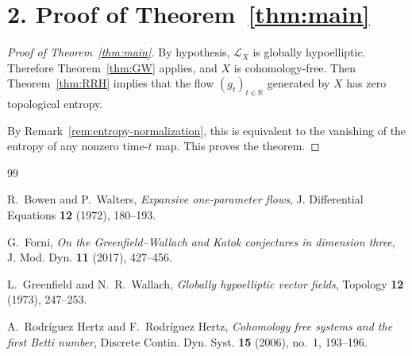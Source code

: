 \documentclass[11pt]{article}
\theoremstyle{definition}
\theoremstyle{remark}
\begin{document}
\section*{2. Proof of Theorem~\ref{thm:main}}

\begin{proof}[Proof of Theorem~\ref{thm:main}]
By hypothesis, $\mathcal L_X$ is globally hypoelliptic. Therefore Theorem~\ref{thm:GW} applies, and $X$ is cohomology-free. Then Theorem~\ref{thm:RRH} implies that the flow $(g_t)_{t\in\mathbb R}$ generated by $X$ has zero topological entropy.

By Remark~\ref{rem:entropy-normalization}, this is equivalent to the vanishing of the entropy of any nonzero time-$t$ map. This proves the theorem.
\end{proof}

\begin{thebibliography}{99}

R.~Bowen and P.~Walters,
\emph{Expansive one-parameter flows},
J. Differential Equations \textbf{12} (1972), 180--193.

G.~Forni,
\emph{On the Greenfield--Wallach and Katok conjectures in dimension three},
J. Mod. Dyn. \textbf{11} (2017), 427--456.

L.~Greenfield and N.~R.~Wallach,
\emph{Globally hypoelliptic vector fields},
Topology \textbf{12} (1973), 247--253.

A.~Rodr\'iguez Hertz and F.~Rodr\'iguez Hertz,
\emph{Cohomology free systems and the first Betti number},
Discrete Contin. Dyn. Syst. \textbf{15} (2006), no.~1, 193--196.

\end{thebibliography}
\end{document}
